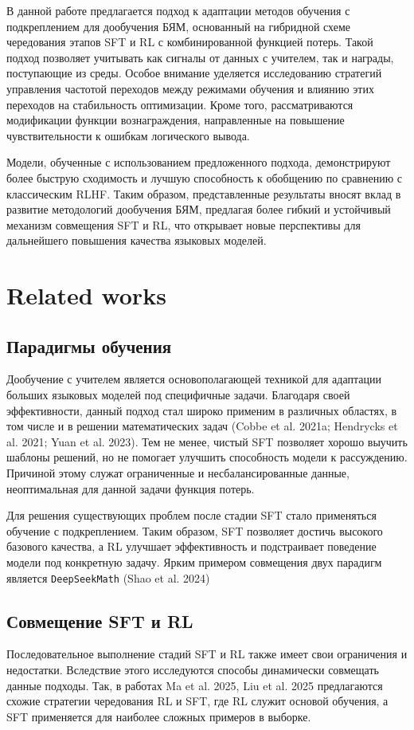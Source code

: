 \documentclass{article}
\begin{document}
В данной работе предлагается подход к адаптации методов обучения с подкреплением для дообучения БЯМ, основанный на гибридной схеме чередования этапов SFT и RL с комбинированной функцией потерь. Такой подход позволяет учитывать как сигналы от данных с учителем, так и награды, поступающие из среды. Особое внимание уделяется исследованию стратегий управления частотой переходов между режимами обучения и влиянию этих переходов на стабильность оптимизации. Кроме того, рассматриваются модификации функции вознаграждения, направленные на повышение чувствительности к ошибкам логического вывода.

Модели, обученные с использованием предложенного подхода, демонстрируют более быструю сходимость и лучшую способность к обобщению по сравнению с классическим RLHF. Таким образом, представленные результаты вносят вклад в развитие методологий дообучения БЯМ, предлагая более гибкий и устойчивый механизм совмещения SFT и RL, что открывает новые перспективы для дальнейшего повышения качества языковых моделей.


\section{Related works}
\subsection{Парадигмы обучения}
Дообучение с учителем является основополагающей техникой для адаптации больших языковых моделей под специфичные задачи. Благодаря своей эффективности, данный подход стал широко применим в различных областях, в том числе и в решении математических задач (Cobbe et al. 2021a; Hendrycks et al. 2021; Yuan et al. 2023). Тем не менее, чистый SFT позволяет хорошо выучить шаблоны решений, но не помогает улучшить способность модели к рассуждению. Причиной этому служат ограниченные и несбалансированные данные, неоптимальная для данной задачи функция потерь.

Для решения существующих проблем после стадии SFT стало применяться обучение с подкреплением. Таким образом, SFT позволяет достичь высокого базового качества, а RL улучшает эффективность и подстраивает поведение модели под конкретную задачу. Ярким примером совмещения двух парадигм является \texttt{DeepSeekMath} (Shao et al. 2024)

\subsection{Совмещение SFT и RL}
Последовательное выполнение стадий SFT и RL также имеет свои ограничения и недостатки. Вследствие этого исследуются способы динамически совмещать данные подходы. Так, в работах Ma et al. 2025, Liu et al. 2025 предлагаются схожие стратегии чередования RL и SFT, где RL служит основой обучения, а SFT применяется для наиболее сложных примеров в выборке.
\end{document}
